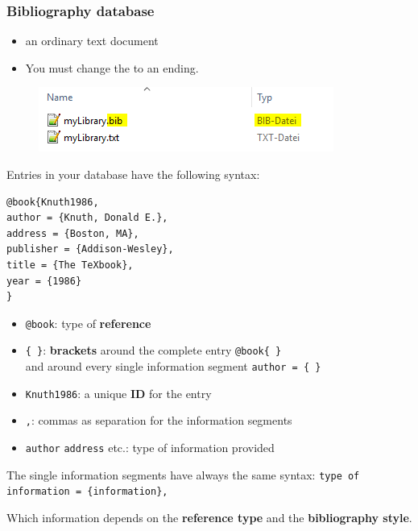 \begin{frame}[fragile]
\frametitle{Bibliography database}

\begin{itemize}
\item an ordinary text document

\item You must change the  to an \alert{} ending.
\end{itemize}

\begin{figure}
\centering
\includegraphics[width=.65\textwidth]{../../texfiles-beamer/tex-material/WissArb-latex/bib_txtDateien}
\end{figure}

\end{frame}

\begin{frame}[fragile]


Entries in your database have the following syntax:


\begin{lstlisting}
@book{Knuth1986,
author = {Knuth, Donald E.},
address = {Boston, MA},
publisher = {Addison-Wesley},
title = {The TeXbook},
year = {1986}
}
\end{lstlisting}

%

\begin{itemize}
	\item \lstinline|@book|: type of \textbf{reference}
	\item \lstinline|{ }|: \textbf{brackets} around the complete entry \lstinline|@book{ }|\\
	and around every single information segment \lstinline|author = { }|
	
	\item \lstinline|Knuth1986|: a unique \textbf{ID} for the entry
	\item \lstinline|,|: commas as separation for the information segments
	\item \lstinline|author| \lstinline|address| etc.: type of information provided
\end{itemize}

The single information segments have always the same syntax: \lstinline|type of information = {information},|

\smallskip 

Which information depends on the \textbf{reference type} and the \textbf{bibliography style}.
\end{frame}


